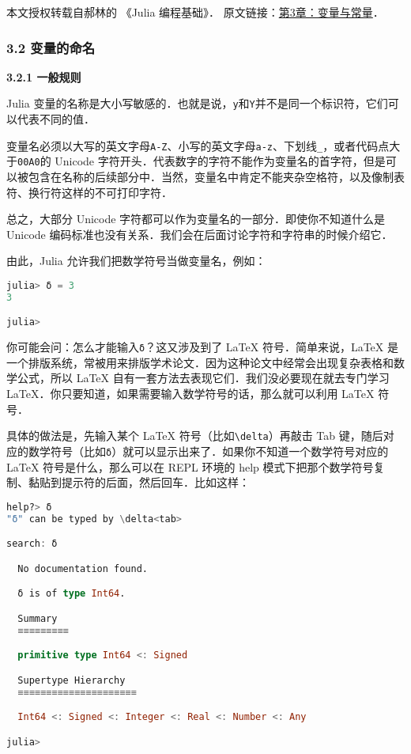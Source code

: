 
本文授权转载自郝林的 《Julia 编程基础》． 原文链接：\href{https://github.com/hyper0x/JuliaBasics/blob/master/book/ch03.md}{第3章：变量与常量}．


\subsubsection{3.2 变量的命名}

\textbf{3.2.1 一般规则}

Julia 变量的名称是大小写敏感的．也就是说，\verb|y|和\verb|Y|并不是同一个标识符，它们可以代表不同的值．

变量名必须以大写的英文字母\verb|A-Z|、小写的英文字母\verb|a-z|、下划线\verb|_|，或者代码点大于\verb|00A0|的 Unicode 字符开头．代表数字的字符不能作为变量名的首字符，但是可以被包含在名称的后续部分中．当然，变量名中肯定不能夹杂空格符，以及像制表符、换行符这样的不可打印字符．

总之，大部分 Unicode 字符都可以作为变量名的一部分．即使你不知道什么是 Unicode 编码标准也没有关系．我们会在后面讨论字符和字符串的时候介绍它．

由此，Julia 允许我们把数学符号当做变量名，例如：

\begin{lstlisting}[language=julia]
julia> δ = 3
3

julia> 
\end{lstlisting}

你可能会问：怎么才能输入\verb|δ|？这又涉及到了 LaTeX 符号．简单来说，LaTeX 是一个排版系统，常被用来排版学术论文．因为这种论文中经常会出现复杂表格和数学公式，所以 LaTeX 自有一套方法去表现它们．我们没必要现在就去专门学习 LaTeX．你只要知道，如果需要输入数学符号的话，那么就可以利用 LaTeX 符号．

具体的做法是，先输入某个 LaTeX 符号（比如\verb|\delta|）再敲击 Tab 键，随后对应的数学符号（比如\verb|δ|）就可以显示出来了．如果你不知道一个数学符号对应的 LaTeX 符号是什么，那么可以在 REPL 环境的 help 模式下把那个数学符号复制、黏贴到提示符的后面，然后回车．比如这样：

\begin{lstlisting}[language=julia]
help?> δ
"δ" can be typed by \delta<tab>

search: δ

  No documentation found.

  δ is of type Int64.

  Summary
  ≡≡≡≡≡≡≡≡≡

  primitive type Int64 <: Signed

  Supertype Hierarchy
  ≡≡≡≡≡≡≡≡≡≡≡≡≡≡≡≡≡≡≡≡≡

  Int64 <: Signed <: Integer <: Real <: Number <: Any

julia> 
\end{lstlisting}


